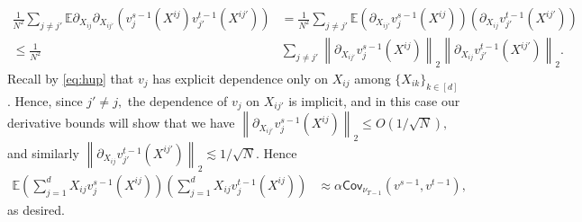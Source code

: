 \documentclass{article}
\newcommand{\1}{\mathbbm{1}}
\newcommand{\norm}[1]{\left\lVert#1\right\rVert}
\theoremstyle{plain}
\theoremstyle{definition}
\theoremstyle{remark}
\newcommand{\E}{\mathbb{E}}
\newcommand{\Cov}{\mathsf{Cov}}
\begin{document}
\begin{align}
    \frac{1}{N^2}\sum_{j\neq j'}\E\partial_{X_{ij}}\partial_{X_{ij'}} (v_j^{s-1}(X^{ij})v_{j'}^{t-1}(X^{ij'})) &= \frac{1}{N^2}\sum_{j\neq j'}\E(\partial_{X_{ij'}} v_j^{s-1}(X^{ij}))(\partial_{X_{ij}}v_{j'}^{t-1}(X^{ij'})) \nonumber\\
    \leq \frac{1}{N^2}&\sum_{j\neq j'}\norm{\partial_{X_{ij'}} v_j^{s-1}(X^{ij})}_2\norm{\partial_{X_{ij}}v_{j'}^{t-1}(X^{ij'})}_2.\label{eq:covariance-cross-term-control}
\end{align}
Recall by \eqref{eq:hup} that $v_j$ has explicit dependence only on $X_{ij}$ among $\{X_{ik}\}_{k\in [d]}$. Hence, since $j'\neq j,$ the dependence of $v_j$ on $X_{ij'}$ is implicit, and in this case our derivative bounds will show that we have $\norm{\partial_{X_{ij'}} v_j^{s-1}(X^{ij})}_2\leq O(1/\sqrt{N}),$ and similarly $\norm{\partial_{X_{ij}}v_{j'}^{t-1}(X^{ij'})}_2\lesssim 1/\sqrt{N}.$ Hence
\begin{align*}
    \E \left(\sum_{j=1}^d X_{ij}v_j^{s-1}(X^{ij})\right)\left(\sum_{j=1}^d X_{ij}v_j^{t-1}(X^{ij})\right) &\approx \alpha  \Cov_{\nu_{T-1}}(v^{s-1},v^{t-1}),
\end{align*}
as desired.
\end{document}
